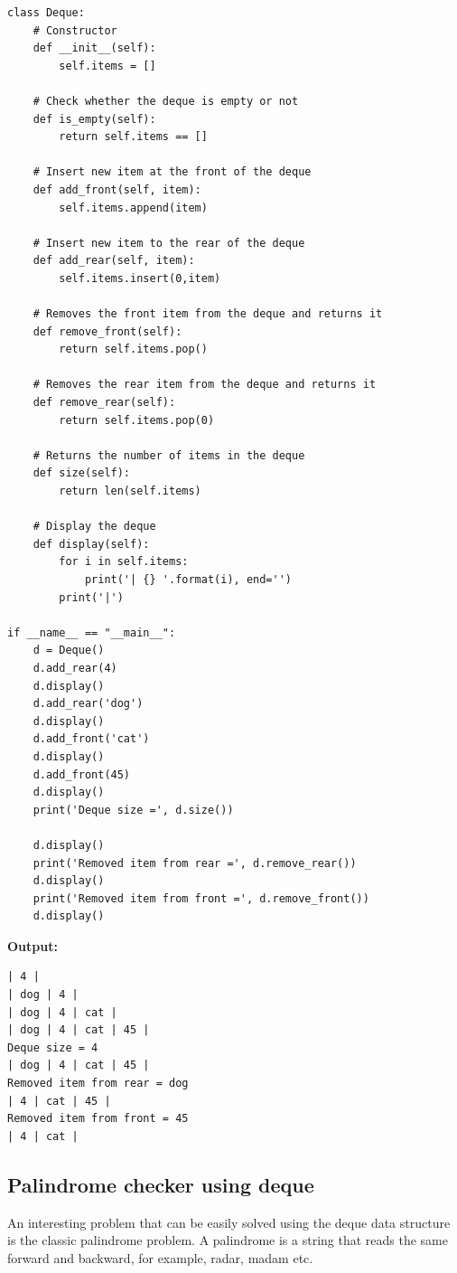 \documentclass[a4paper,11pt]{book}
\begin{document}
\begin{lstlisting}
class Deque:
    # Constructor
    def __init__(self):
        self.items = []
    
    # Check whether the deque is empty or not
    def is_empty(self):
        return self.items == []
    
    # Insert new item at the front of the deque
    def add_front(self, item):
        self.items.append(item)
    
    # Insert new item to the rear of the deque
    def add_rear(self, item):
        self.items.insert(0,item)
    
    # Removes the front item from the deque and returns it
    def remove_front(self):
        return self.items.pop()
    
    # Removes the rear item from the deque and returns it
    def remove_rear(self):
        return self.items.pop(0)
    
    # Returns the number of items in the deque
    def size(self):
        return len(self.items)
    
    # Display the deque
    def display(self):
        for i in self.items:
            print('| {} '.format(i), end='')
        print('|')
                                
if __name__ == "__main__":
    d = Deque()       
    d.add_rear(4)
    d.display()
    d.add_rear('dog') 
    d.display()
    d.add_front('cat') 
    d.display()
    d.add_front(45)
    d.display()
    print('Deque size =', d.size())
    
    d.display()
    print('Removed item from rear =', d.remove_rear())
    d.display()
    print('Removed item from front =', d.remove_front())
    d.display()
\end{lstlisting}
\textbf{Output:}
\begin{lstlisting}
| 4 |
| dog | 4 |
| dog | 4 | cat |
| dog | 4 | cat | 45 |
Deque size = 4
| dog | 4 | cat | 45 |
Removed item from rear = dog
| 4 | cat | 45 |
Removed item from front = 45
| 4 | cat |
\end{lstlisting}

\subsection{Palindrome checker using deque}

\noindent An interesting problem that can be easily solved using the deque data structure is the classic palindrome problem. A palindrome is a string that reads the same forward and backward, for example, radar, madam etc.\\
\end{document}
